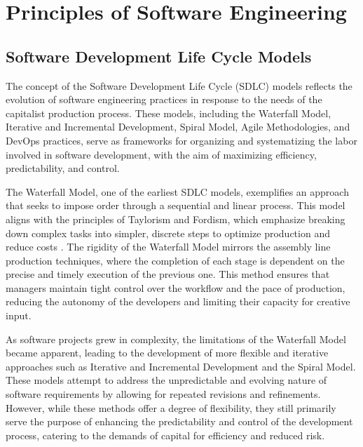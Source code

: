 \chapter{Principles of Software Engineering}
\begin{refsection}

\section{Software Development Life Cycle Models}

The concept of the Software Development Life Cycle (SDLC) models reflects the evolution of software engineering practices in response to the needs of the capitalist production process. These models, including the Waterfall Model, Iterative and Incremental Development, Spiral Model, Agile Methodologies, and DevOps practices, serve as frameworks for organizing and systematizing the labor involved in software development, with the aim of maximizing efficiency, predictability, and control.

The Waterfall Model, one of the earliest SDLC models, exemplifies an approach that seeks to impose order through a sequential and linear process. This model aligns with the principles of Taylorism and Fordism, which emphasize breaking down complex tasks into simpler, discrete steps to optimize production and reduce costs \cite[pp.~12-15]{Royce1970}. The rigidity of the Waterfall Model mirrors the assembly line production techniques, where the completion of each stage is dependent on the precise and timely execution of the previous one. This method ensures that managers maintain tight control over the workflow and the pace of production, reducing the autonomy of the developers and limiting their capacity for creative input.

As software projects grew in complexity, the limitations of the Waterfall Model became apparent, leading to the development of more flexible and iterative approaches such as Iterative and Incremental Development and the Spiral Model. These models attempt to address the unpredictable and evolving nature of software requirements by allowing for repeated revisions and refinements. However, while these methods offer a degree of flexibility, they still primarily serve the purpose of enhancing the predictability and control of the development process, catering to the demands of capital for efficiency and reduced risk.


\end{refsection}
